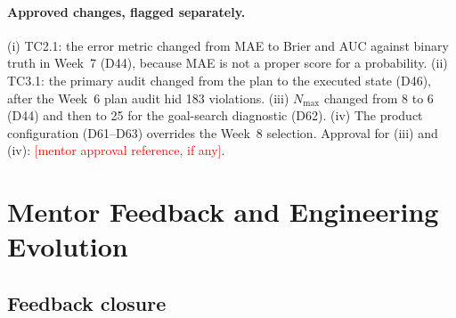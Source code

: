 \documentclass[11pt,a4paper]{article}
\newcommand{\fillin}[1]{\textcolor{red}{[#1]}}
\begin{document}
\paragraph{Approved changes, flagged separately.} (i) TC2.1: the error metric changed from MAE to Brier and AUC against binary truth in Week~7 (D44), because MAE is not a proper score for a probability. (ii) TC3.1: the primary audit changed from the plan to the executed state (D46), after the Week~6 plan audit hid 183 violations. (iii) $N_{\max}$ changed from 8 to 6 (D44) and then to 25 for the goal-search diagnostic (D62). (iv) The product configuration (D61--D63) overrides the Week~8 selection. Approval for (iii) and (iv): \fillin{mentor approval reference, if any}.

\section{Mentor Feedback and Engineering Evolution}

\subsection{Feedback closure}
\end{document}
